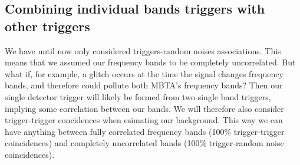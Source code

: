 \clearpage
\subsection{Combining individual bands triggers with other triggers}

We have until now only considered triggers-random noises associations.
This means that we assumed our frequency bands to be completely uncorrelated.
But what if, for example, a glitch occurs at the time the signal changes frequency bands, and therefore could pollute both MBTA's frequency bands?
Then our single detector trigger will likely be formed from two single band triggers, implying some correlation between our bands.
We will therefore also consider trigger-trigger concidences when esimating our background.
This way we can have anything between fully correlated frequency bands (100\% trigger-trigger coincidences) and completely uncorrelated bands (100\% trigger-random noise coincidences).

